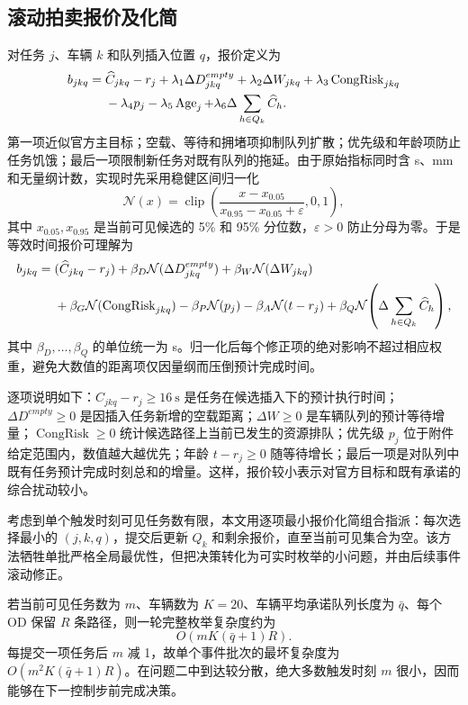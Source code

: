 \documentclass[UTF8]{ctexart}
\begin{document}
\subsection{滚动拍卖报价及化简}

对任务 $j$、车辆 $k$ 和队列插入位置 $q$，报价定义为
\begin{align}\label{eq:q2-bid}
b_{jkq}={}&\widehat C_{jkq}-r_j+\lambda_1\Delta D_{jkq}^{empty}+\lambda_2\Delta W_{jkq}
+\lambda_3\operatorname{CongRisk}_{jkq}\notag\\
&-\lambda_4p_j-\lambda_5\operatorname{Age}_j+\lambda_6\Delta\sum_{h\in Q_k}\widehat C_h.
\end{align}
第一项近似官方主目标；空载、等待和拥堵项抑制队列扩散；优先级和年龄项防止任务饥饿；最后一项限制新任务对既有队列的拖延。由于原始指标同时含 s、mm 和无量纲计数，实现时先采用稳健区间归一化
\begin{equation}\label{eq:robust-normalize}
\mathcal N(x)=\operatorname{clip}\left(
\frac{x-x_{0.05}}{x_{0.95}-x_{0.05}+\varepsilon},0,1\right),
\end{equation}
其中 $x_{0.05},x_{0.95}$ 是当前可见候选的 5\% 和 95\% 分位数，$\varepsilon>0$ 防止分母为零。于是等效时间报价可理解为
\begin{align}\label{eq:q2-bid-normalized}
b_{jkq}={}&(\widehat C_{jkq}-r_j)
+\beta_D\mathcal N(\Delta D_{jkq}^{empty})
+\beta_W\mathcal N(\Delta W_{jkq})\\
&+\beta_G\mathcal N(\operatorname{CongRisk}_{jkq})
-\beta_P\mathcal N(p_j)-\beta_A\mathcal N(t-r_j)
+\beta_Q\mathcal N\!\left(\Delta\sum_{h\in Q_k}\widehat C_h\right),\notag
\end{align}
其中 $\beta_D,\ldots,\beta_Q$ 的单位统一为 s。归一化后每个修正项的绝对影响不超过相应权重，避免大数值的距离项仅因量纲而压倒预计完成时间。

逐项说明如下：$\widehat C_{jkq}-r_j\ge16\ \mathrm{s}$ 是任务在候选插入下的预计执行时间；$\Delta D^{empty}\ge0$ 是因插入任务新增的空载距离；$\Delta W\ge0$ 是车辆队列的预计等待增量；$\operatorname{CongRisk}\ge0$ 统计候选路径上当前已发生的资源排队；优先级 $p_j$ 位于附件给定范围内，数值越大越优先；年龄 $t-r_j\ge0$ 随等待增长；最后一项是对队列中既有任务预计完成时刻总和的增量。这样，报价较小表示对官方目标和既有承诺的综合扰动较小。

考虑到单个触发时刻可见任务数有限，本文用逐项最小报价化简组合指派：每次选择最小的 $(j,k,q)$，提交后更新 $Q_k$ 和剩余报价，直至当前可见集合为空。该方法牺牲单批严格全局最优性，但把决策转化为可实时枚举的小问题，并由后续事件滚动修正。

若当前可见任务数为 $m$、车辆数为 $K=20$、车辆平均承诺队列长度为 $\bar q$、每个 OD 保留 $R$ 条路径，则一轮完整枚举复杂度约为
\begin{equation}
O(mK(\bar q+1)R).
\end{equation}
每提交一项任务后 $m$ 减 1，故单个事件批次的最坏复杂度为 $O(m^2K(\bar q+1)R)$。在问题二中到达较分散，绝大多数触发时刻 $m$ 很小，因而能够在下一控制步前完成决策。
\end{document}
